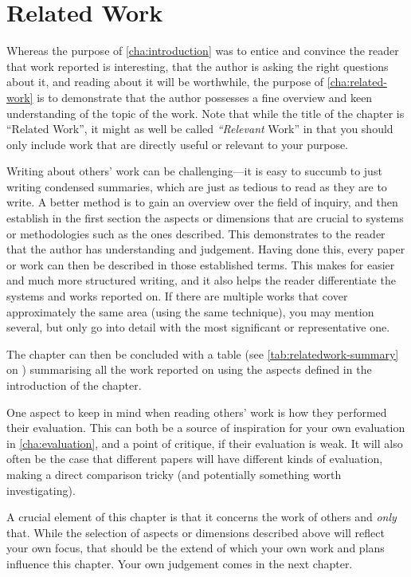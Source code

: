 \chapter{Related Work}
\label{cha:related-work}

Whereas the purpose of \autoref{cha:introduction} was to entice and
convince the reader that work reported is interesting, that the author
is asking the right questions about it, and reading about it will be
worthwhile, the purpose of \autoref{cha:related-work} is to
demonstrate that the author possesses a fine overview and keen
understanding of the topic of the work.  Note that while the title of
the chapter is ``Related Work'', it might as well be called
\emph{``Relevant} Work'' in that you should only include work that are
directly useful or relevant to your purpose. 

Writing about others' work can be challenging---it is easy to succumb to just
writing condensed summaries, which are just as tedious to read as they are to
write.  A better method is to gain an overview over the field of inquiry, and
then establish in the first section the aspects or dimensions that are crucial
to systems or methodologies such as the ones described. This demonstrates to
the reader that the author has understanding and judgement. Having done this,
every paper or work can then be described in those established terms. This
makes for easier and much more structured writing, and it also helps the
reader differentiate the systems and works reported on. If there are multiple
works that cover approximately the same area (\eg using the same technique),
you may mention several, but only go into detail with the most significant or
representative one.

The chapter can then be concluded with a table (see
\autoref{tab:relatedwork-summary} on )
summarising all the work reported on using the aspects defined in the
introduction of the chapter.

One aspect to keep in mind when reading others' work is how they performed
their evaluation. This can both be a source of inspiration for your own
evaluation in \autoref{cha:evaluation}, and a point of critique, if their
evaluation is weak. It will also often be the case that different papers will
have different kinds of evaluation, making a direct comparison tricky (and
potentially something worth investigating).

A crucial element of this chapter is that it concerns the work of others and
\emph{only} that. While the selection of aspects or dimensions described
above will reflect your own focus, that should be the extend of which your
own work and plans influence this chapter.  Your own judgement comes in the
next chapter.

